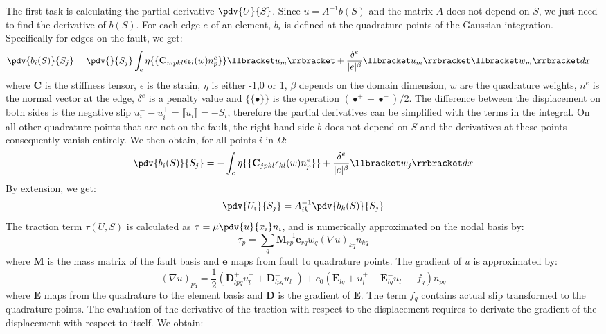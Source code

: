 The first task is calculating the partial derivative $\pdv{ U}{ S}$. Since $u = A^{-1}b(S)$ and the matrix $A$ does not depend on $S$, we just need to find the derivative of $b(S)$. For each edge $e$ of an element, $b_i$ is defined at the quadrature points of the Gaussian integration. Specifically for edges on the fault, we get:
\begin{align}
\pdv{b_i(S)}{S_j} &= \pdv{}{S_j}\int_e \eta \{\{\mathbf{C}_{mpkl}\epsilon_{kl}(w)n_p^e\}\}\llbracket u_m \rrbracket + \frac{\delta^e}{|e|^\beta}\llbracket u_m \rrbracket\llbracket w_m \rrbracket dx
\end{align}
where $\mathbf{C}$ is the stiffness tensor, $\epsilon$ is the strain, $\eta$ is either -1,0 or 1, $\beta$ depends on the domain dimension, $w$ are the quadrature weights, $n^e$ is the normal vector at the edge, $\delta^e$ is a penalty value and $\{\{\bullet\}\}$ is the operation $(\bullet^+ + \bullet^-) / 2$. The difference between the displacement on both sides is the negative slip $u_i^- - u_i^+ = \llbracket u_i \rrbracket = -S_i$, therefore the partial derivatives can be simplified with the terms in the integral. On all other quadrature points that are not on the fault, the right-hand side $b$ does not depend on $S$ and the derivatives at these points consequently vanish entirely. We then obtain, for all points $i$ in $\Omega$:
\begin{equation}
\label{eq:db_dS}
\pdv{b_i(S)}{S_j} = -\int_e 
\eta  \{\{\mathbf{C}_{jpkl}\epsilon_{kl}(w)n_p^e\}\} +
\frac{\delta^e}{|e|^\beta}\llbracket w_j \rrbracket dx
\end{equation}
By extension, we get:
\begin{equation}
\pdv{ U_i}{ S_j} = A_{ik}^{-1}\pdv{b_k(S)}{S_j}
\end{equation}
The traction term $\tau(U,S)$ is calculated as $\tau = \mu \pdv{ u}{ x_i}n_i$, and is numerically approximated on the nodal basis by:
 \begin{equation}
 	\tau_p = \sum_q \mathbf{M}_{rp}^{-1}\mathbf{e}_{rq}w_q(\nabla u)_{kq}n_{kq}
 \end{equation} 
where $\mathbf{M}$ is the mass matrix of the fault basis and $\mathbf{e}$ maps from fault to quadrature points. The gradient of $u$ is approximated by: 
\begin{equation}
	(\nabla u)_{pq} = \frac{1}{2}\left(\mathbf{D}_{lpq}^+u_l^+ + \mathbf{D}_{lpq}^-u_l^-\right) + c_0\left(\mathbf{E}_{lq}+u_l^+ - \mathbf{E}_{lq}^-u_l^- - f_q\right)n_{pq}
\end{equation}
where $\mathbf{E}$ maps from the quadrature to the element basis and $\mathbf{D}$ is the gradient of $\mathbf{E}$. The term $f_q$ contains actual slip transformed to the quadrature points. The evaluation of the derivative of the traction with respect to the displacement requires to derivate the gradient of the displacement with respect to itself. We obtain: 
